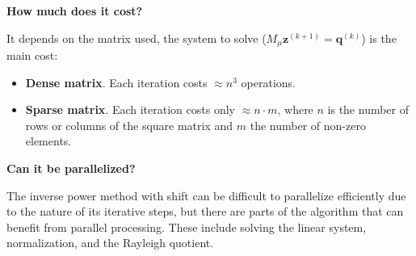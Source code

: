 \highspace
\begin{flushleft}
    \textcolor{Red2}{ \textbf{How much does it cost?}}
\end{flushleft}
It depends on the matrix used, the system to solve ($M_{\mu}\mathbf{z}^{\left(k+1\right)} = \mathbf{q}^{\left(k\right)}$) is the main cost:
\begin{itemize}
    \item \textbf{Dense matrix}. Each iteration costs $\approx n^{3}$ operations.
    \item \textbf{Sparse matrix}. Each iteration costs only $\approx n \cdot m$, where $n$ is the number of rows or columns of the square matrix and $m$ the number of non-zero elements.
\end{itemize}

\highspace
\begin{flushleft}
    \textcolor{Green3}{ \textbf{Can it be parallelized?}}
\end{flushleft}
The inverse power method with shift can be difficult to parallelize efficiently due to the nature of its iterative steps, but there are parts of the algorithm that can benefit from parallel processing. These include solving the linear system, normalization, and the Rayleigh quotient.